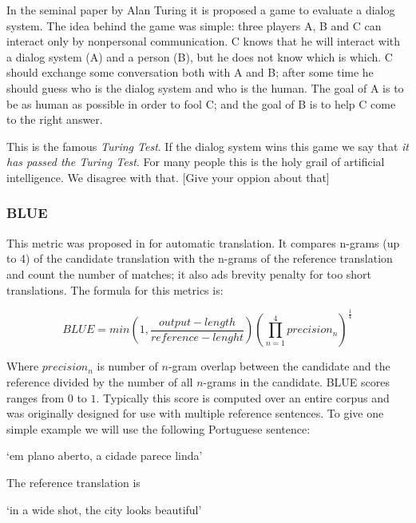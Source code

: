In the seminal paper by Alan Turing \cite{Turing} it is proposed a game to evaluate a dialog system. The idea behind the game was simple: three players A, B and C can interact only by nonpersonal communication. C knows that he will interact with a dialog system (A) and a person (B), but he does not know which is which. C should exchange some conversation both with A and B; after some time he should guess who is the dialog system and who is the human. The goal of A is to be as human as possible in order to fool C; and the goal of B is to help C come to the right answer.

\par This is the famous \textit{Turing Test}. If the dialog system wins this game we say that \textit{it has passed the Turing Test}. For many people this is the holy grail of artificial intelligence. We disagree with that. [Give your oppion about that]


\subsubsection{BLUE}
This metric was proposed in \cite{Papineni2001} for automatic translation. It compares n-grams (up to 4) of the candidate translation with the n-grams of the reference translation and count the number of matches; it also ads brevity penalty for too short translations. The formula for this metrics is:

\begin{equation}
BLUE = min \left(1, \frac{output-length}{reference-lenght} \right) \left(\prod_{n=1}^{4} precision_{n} \right)^{\frac{1}{4}}
\end{equation}

Where $precision_{n}$ is number of $n$-gram overlap between the candidate and the reference divided by the number of all $n$-grams in the candidate. BLUE scores ranges from $0$ to $1$. Typically this score is computed over an entire corpus and was originally designed for use with multiple reference sentences. To give one simple example we will use the following Portuguese sentence:

\begin{center}
`em plano aberto, a cidade parece linda'
\end{center}

The reference translation is

\begin{center}
`in a wide shot, the city looks beautiful'
\end{center}

